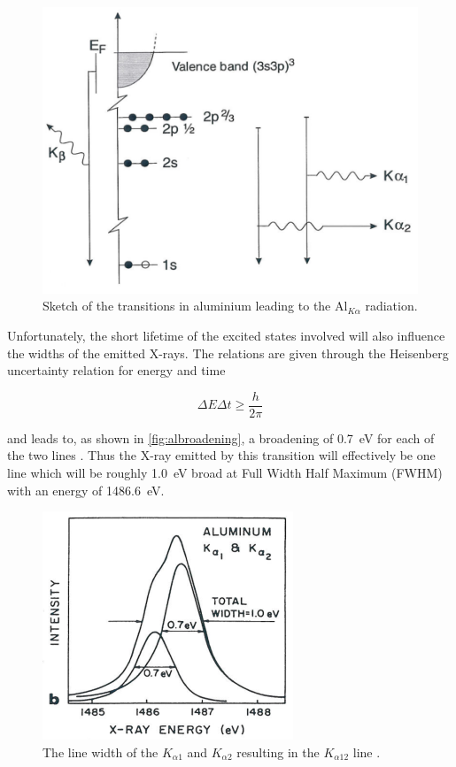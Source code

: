 \begin{figure}[h!]
	\begin{center}
	\includegraphics[scale=3]{figures/04_03.png}
	\caption{Sketch of the transitions in
          aluminium leading to the Al$_{K\alpha}$ radiation.}
	\label{fig:altransition}
	\end{center}
\end{figure}

Unfortunately, the short lifetime of the excited states involved will also influence the widths of the emitted X-rays. The relations are given through the Heisenberg uncertainty relation for energy and time

\begin{equation}
\Delta E \Delta t \geq \frac{h}{2\pi}
\end{equation}

\noindent and leads to, as shown in \autoref{fig:albroadening}, a broadening of \SI{0.7}{\electronvolt} for each of the two lines \cite{siegbahn1}. Thus the X-ray emitted by this transition will effectively be one line which will be roughly \SI{1.0}{\electronvolt} broad at Full Width Half Maximum (FWHM) with an energy of \SI{1486.6}{\electronvolt}.

\begin{figure}[h!]
	\begin{center}
	\includegraphics[scale=4]{figures/04_04.png}
	\caption{The line width of the $K_{\alpha 1}$ and $K_{\alpha2}$ resulting in the $K_{\alpha 12}$ line \cite{siegbahn1}.}
	\label{fig:albroadening}
	\end{center}
\end{figure}


